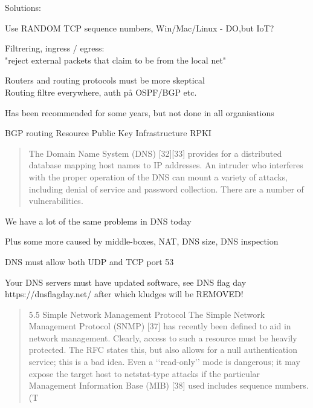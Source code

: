 \documentclass[Screen16to9,17pt]{foils}
\begin{document}

\begin{list1}
\item Solutions:
\begin{list2}
\item Use RANDOM TCP sequence numbers, Win/Mac/Linux - DO,but IoT?
\item Filtrering, ingress / egress:\\
"reject external packets that claim to be from the local net"
\item Routers and routing protocols must be more skeptical\\
Routing filtre everywhere, auth på OSPF/BGP etc.
\end{list2}
\item Has been recommended for some years, but not done in all organisations
\item BGP routing Resource Public Key Infrastructure RPKI
\end{list1}


\begin{quote}
The Domain Name System (DNS) [32][33] provides for a distributed database mapping host names to IP
addresses. An intruder who interferes with the proper operation of the DNS can mount a variety of
attacks, including denial of service and password collection. There are a number of vulnerabilities.
\end{quote}

\begin{list1}
\item We have a lot of the same problems in DNS today
\item Plus some more caused by middle-boxes, NAT, DNS size, DNS inspection
\begin{list2}
\item DNS must allow both UDP and TCP port 53
\item Your DNS servers must have updated software, see DNS flag day\\ https://dnsflagday.net/ after which kludges will be REMOVED!
\end{list2}
\end{list1}


\begin{quote}
5.5 Simple Network Management Protocol
The Simple Network Management Protocol (SNMP) [37] has recently been defined to aid in network
management. Clearly, access to such a resource must be heavily protected. The RFC states this, but
also allows for a null authentication service; this is a bad idea. Even a ‘‘read-only’’ mode is dangerous;
it may expose the target host to netstat-type attacks if the particular Management Information Base
(MIB) [38] used includes sequence numbers. (T
\end{quote}
\end{document}
